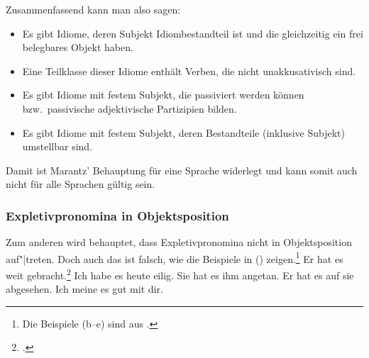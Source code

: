 Zusammenfassend kann man also sagen:
\begin{itemize}
\item Es gibt Idiome, deren Subjekt Idiombestandteil ist und die gleichzeitig ein frei belegbares Objekt haben.
\item Eine Teilklasse dieser Idiome enthält Verben, die nicht unakkusativisch sind.
\item Es gibt Idiome mit festem Subjekt, die passiviert werden können bzw.\ passivische adjektivische Partizipien bilden.
\item Es gibt Idiome mit festem Subjekt, deren Bestandteile (inklusive Subjekt) umstellbar sind.
\end{itemize}
Damit ist Marantz' Behauptung für eine Sprache widerlegt und kann somit auch nicht für alle Sprachen gültig sein.

\subsubsection{Expletivpronomina in Objektsposition}
\label{sec-expletivum-in-obj-position}

%
Zum anderen wird behauptet, dass Expletivpronomina nicht in Objektsposition auf"|treten.
Doch auch das
ist falsch, wie die Beispiele in () zeigen.\footnote{
  Die Beispiele (b--e) sind aus .
}
\eal
\ex Er hat es weit gebracht.\footnote{
        .
}
\ex Ich habe es heute eilig.
\ex Sie hat es ihm angetan.
\ex Er hat es auf sie abgesehen.
\ex Ich meine es gut mit dir.
\zl

